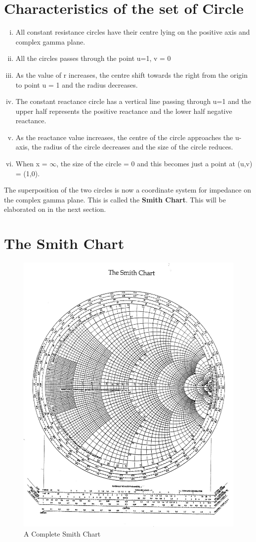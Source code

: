 \section{Characteristics of the set of Circle}
\begin{enumerate}[(i)]
\item All constant resistance circles have their centre lying on the positive axis and complex gamma plane.
\item All the circles passes through the point u=1, v = 0
\item As the value of r increases, the centre shift towards the right from the origin to point u = 1 and the radius decreases.
\item The constant reactance circle has a vertical line passing through u=1 and the upper half represents the positive reactance and the lower half negative reactance.
\item As the reactance value increases, the centre of the circle approaches the u-axis, the radius of the circle decreases and the size of the circle reduces.
\item When x = $\infty$, the size of the circle = 0  and this  becomes just a point at (u,v) = (1,0).
\end{enumerate}

The superposition of the two circles is now a coordinate system for impedance on the complex gamma plane. This is called the \textbf{Smith Chart}.  This will be elaborated on in  the next section.
\section{The Smith Chart}
\begin{figure}[h]
\centering
\includegraphics[width=0.7\linewidth]{"./graphics/smith_chart (2)"}
\caption{A Complete Smith Chart}
\label{fig:smithchart-2}
\end{figure}

